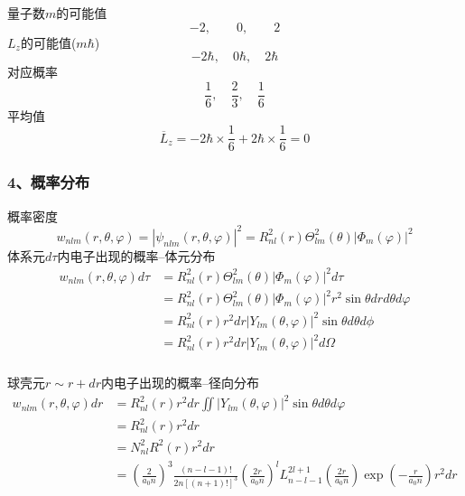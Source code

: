 \begin{frame}[label=current]
  \frametitle{}
量子数$m$的可能值
$$ -2, \qquad 0, \qquad 2$$
$L_z$的可能值($m\hbar$)
$$ -2\hbar, \quad 0\hbar, \quad 2\hbar$$
对应概率
$$ \frac{1}{6}, \quad \frac{2}{3}, \quad \frac{1}{6}$$
平均值
$$\overline{L}_z = -2\hbar \times \frac{1}{6} + 2\hbar \times \frac{1}{6} =0 $$
\end{frame} 




\begin{frame}
\frametitle{4、概率分布 }
 概率密度
$$
w_{n l m}(r, \theta, \varphi)=\left|\psi_{n l m}(r, \theta, \varphi)\right|^2=R_{n l}^2(r) \Theta_{l m}^2(\theta)\left|\Phi_m(\varphi)\right|^2
$$
体系元$d\tau$内电子出现的概率--体元分布
$$
\begin{aligned}
w_{n l m}(r, \theta, \varphi) d \tau &= R_{n l}^2(r) \Theta_{l m}^2(\theta)\left|\Phi_m(\varphi)\right|^2 d \tau \\
&=R_{n l}^2(r) \Theta_{l m}^2(\theta)\left|\Phi_m(\varphi)\right|^2 r^2 \sin \theta d r d \theta d \varphi \\
&=R^2_{n l}(r) r^2 d r\left|Y_{l m}(\theta, \varphi)\right|^2 \sin \theta d \theta d \phi \\
&=R^2_{n l}(r) r^2 d r\left|Y_{l m}(\theta, \varphi)\right|^2 d\Omega
\end{aligned}
$$
\end{frame} 

\begin{frame}[label=current]
\frametitle{}
球壳元$r \sim r+dr$内电子出现的概率--径向分布
$$
\begin{aligned}
w_{n l m}(r, \theta, \varphi) d r 
& =R^2_{n l}(r) r^2 d r \iint \left|Y_{l m}(\theta, \varphi)\right|^2 \sin \theta d \theta d \varphi \\
&= R^2_{n l}(r) r^2 d r \\
&= N^2_{n l} R^2 (r) r^2 d r \\
&= \left(\frac{2}{a_0 n}\right)^3 \frac{ (n-l-1)!}{2n [(n+1)!]^3 } (\frac{2r}{a_0 n})^l L_{n-l-1} ^{2l+1} (\frac{2r}{a_0 n}) \exp(-\frac{r}{a_0 n}) r^2 d r
\end{aligned}
$$
\end{frame}

